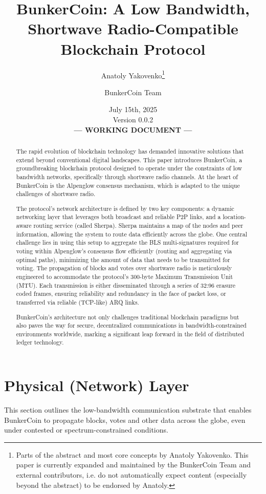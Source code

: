 \documentclass{article}
\title{BunkerCoin: A Low Bandwidth, Shortwave Radio-Compatible Blockchain Protocol}
\author{Anatoly Yakovenko\thanks{Parts of the abstract and most core concepts by Anatoly Yakovenko. This paper is currently expanded and maintained by the BunkerCoin Team and external contributors, i.e. do not automatically expect content (especially beyond the abstract) to be endorsed by Anatoly.} \and BunkerCoin Team}
\date{July 15th, 2025\\Version 0.0.2 \\[1em] \textbf{--- WORKING DOCUMENT ---}}
\begin{document}
\maketitle

\begin{abstract}
The rapid evolution of blockchain technology has demanded innovative solutions that extend beyond conventional digital landscapes. This paper introduces BunkerCoin, a groundbreaking blockchain protocol designed to operate under the constraints of low bandwidth networks, specifically through shortwave radio channels. At the heart of BunkerCoin is the Alpenglow consensus mechanism, which is adapted to the unique challenges of shortwave radio.

The protocol's network architecture is defined by two key components: a dynamic networking layer that leverages both broadcast and reliable P2P links, and a location-aware routing service (called Sherpa). Sherpa maintains a map of the nodes and peer information, allowing the system to route data efficiently across the globe. One central challenge lies in using this setup to aggregate the BLS multi-signatures required for voting within Alpenglow's consensus flow efficiently (routing and aggregating via optimal paths), minimizing the amount of data that needs to be transmitted for voting. The propagation of blocks and votes over shortwave radio is meticulously engineered to accommodate the protocol's 300-byte Maximum Transmission Unit (MTU). Each transmission is either disseminated through a series of 32:96 erasure coded frames, ensuring reliability and redundancy in the face of packet loss, or transferred via reliable  (TCP-like) ARQ links.

BunkerCoin's architecture not only challenges traditional blockchain paradigms but also paves the way for secure, decentralized communications in bandwidth-constrained environments worldwide, marking a significant leap forward in the field of distributed ledger technology.
\end{abstract}

\section{Physical (Network) Layer}
\label{sec:physical}

This section outlines the low-bandwidth communication substrate that enables BunkerCoin to propagate blocks, votes and other data across the globe, even under contested or spectrum-constrained conditions.
\end{document}
